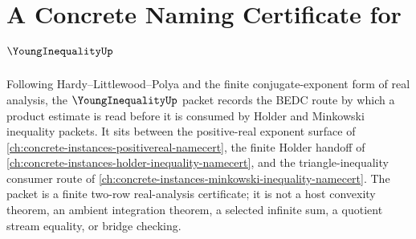 \chapter{A Concrete Naming Certificate for $\YoungInequalityUp$}
\label{ch:concrete-instances-young-inequality-namecert}

Following Hardy--Littlewood--Polya and the finite conjugate-exponent form of real analysis, the $\YoungInequalityUp$ packet records the BEDC route by which a product estimate is read before it is consumed by Holder and Minkowski inequality packets. It sits between the positive-real exponent surface of \autoref{ch:concrete-instances-positivereal-namecert}, the finite Holder handoff of \autoref{ch:concrete-instances-holder-inequality-namecert}, and the triangle-inequality consumer route of \autoref{ch:concrete-instances-minkowski-inequality-namecert}. The packet is a finite two-row real-analysis certificate; it is not a host convexity theorem, an ambient integration theorem, a selected infinite sum, a quotient stream equality, or bridge checking.

